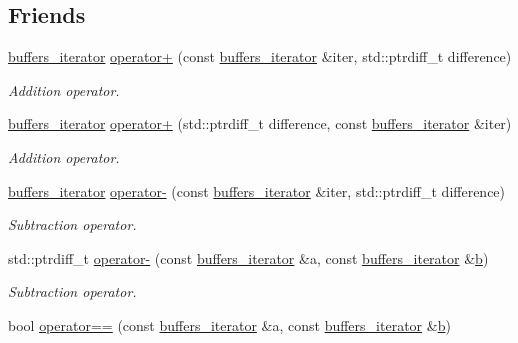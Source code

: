 \subsection*{Friends}
\begin{DoxyCompactItemize}
\item 
\hyperlink{classasio_1_1buffers__iterator}{buffers\+\_\+iterator} \hyperlink{classasio_1_1buffers__iterator_acea56d9ae172fdd6066e6a131b484f45}{operator+} (const \hyperlink{classasio_1_1buffers__iterator}{buffers\+\_\+iterator} \&iter, std\+::ptrdiff\+\_\+t difference)
\begin{DoxyCompactList}\small\item\em Addition operator. \end{DoxyCompactList}\item 
\hyperlink{classasio_1_1buffers__iterator}{buffers\+\_\+iterator} \hyperlink{classasio_1_1buffers__iterator_aad6bde833b69433827c6e639f61265f6}{operator+} (std\+::ptrdiff\+\_\+t difference, const \hyperlink{classasio_1_1buffers__iterator}{buffers\+\_\+iterator} \&iter)
\begin{DoxyCompactList}\small\item\em Addition operator. \end{DoxyCompactList}\item 
\hyperlink{classasio_1_1buffers__iterator}{buffers\+\_\+iterator} \hyperlink{classasio_1_1buffers__iterator_a97ab5a1933a2203b60e8e700ee66dd47}{operator-\/} (const \hyperlink{classasio_1_1buffers__iterator}{buffers\+\_\+iterator} \&iter, std\+::ptrdiff\+\_\+t difference)
\begin{DoxyCompactList}\small\item\em Subtraction operator. \end{DoxyCompactList}\item 
std\+::ptrdiff\+\_\+t \hyperlink{classasio_1_1buffers__iterator_a8823a26d52ca449f27ed25ad2e9121dd}{operator-\/} (const \hyperlink{classasio_1_1buffers__iterator}{buffers\+\_\+iterator} \&a, const \hyperlink{classasio_1_1buffers__iterator}{buffers\+\_\+iterator} \&\hyperlink{group__async__read_ga945a5c18fa77a9e2eba420f8f44b2a4f}{b})
\begin{DoxyCompactList}\small\item\em Subtraction operator. \end{DoxyCompactList}\item 
bool \hyperlink{classasio_1_1buffers__iterator_aa9fddd43f422d93bde4629b8d93008b7}{operator==} (const \hyperlink{classasio_1_1buffers__iterator}{buffers\+\_\+iterator} \&a, const \hyperlink{classasio_1_1buffers__iterator}{buffers\+\_\+iterator} \&\hyperlink{group__async__read_ga945a5c18fa77a9e2eba420f8f44b2a4f}{b})

\end{DoxyCompactItemize}
